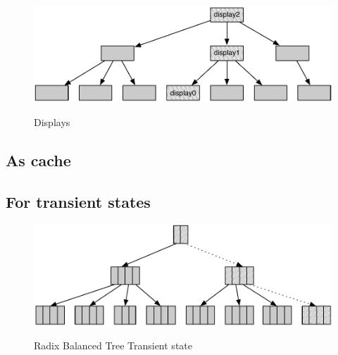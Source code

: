 \begin{figure}[h!]
  \centering
  \includegraphics[width=\textwidth]{Figures/Displays}
  \label{Displays}
  \caption{Displays}
\end{figure}


\subsection{As cache}



\subsection{For transient states}

\begin{figure}[h!]
  \centering
  \includegraphics[width=\textwidth]{Figures/Transient_state}
  \label{Transient_state}
  \caption{Radix Balanced Tree Transient state}
\end{figure}



